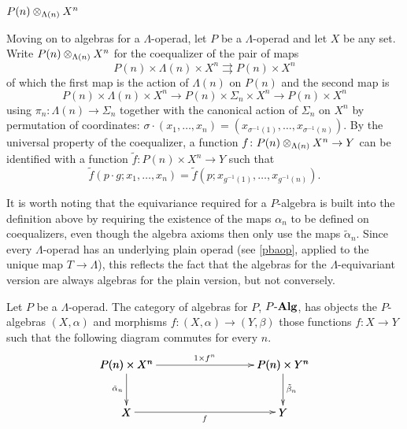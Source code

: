 $P(n) \otimes_{\Lambda(n)} X^{n}$

Moving on to algebras for a $\Lambda$-operad, let $P$ be a $\Lambda$-operad and let $X$ be any set. Write $P(n) \otimes_{\Lambda(n)} X^{n}$ for the coequalizer of the pair of maps
  \[
    P(n) \times \Lambda(n) \times X^{n} \rightrightarrows P(n) \times X^{n}
  \]
of which the first map is the action of $\Lambda(n)$ on $P(n)$ and the second map is
  \[
    P(n) \times \Lambda(n) \times X^{n} \rightarrow P(n) \times \Sigma_{n} \times X^{n} \rightarrow P(n) \times X^{n}
  \]
using $\pi_{n} \colon \Lambda(n) \rightarrow \Sigma_{n}$ together with the canonical action of $\Sigma_{n}$ on $X^{n}$ by permutation of coordinates: $\sigma \cdot (x_{1}, \ldots, x_{n}) = (x_{\sigma^{-1}(1)}, \ldots, x_{\sigma^{-1}(n)})$. By the universal property of the coequalizer, a function $f \colon P(n) \otimes_{\Lambda(n)} X^{n} \rightarrow Y$ can be identified with a function $\tilde{f} \colon P(n) \times X^{n} \rightarrow Y$ such that
  \[
    \tilde{f}(p\cdot g; x_{1}, \ldots, x_{n}) = \tilde{f}\left(p; x_{g^{-1}(1)}, \ldots, x_{g^{-1}(n)}\right).
  \]

\begin{rem}
It is worth noting that the equivariance required for a $P$-algebra is built into the definition above by requiring the existence of the maps $\alpha_{n}$ to be defined on coequalizers, even though the algebra axioms then only use the maps $\tilde{\alpha}_{n}$. Since every $\Lambda$-operad has an underlying plain operad (see \cref{pbaop}, applied to the unique map $T \rightarrow \Lambda$), this reflects the fact that the algebras for the $\Lambda$-equivariant version are always algebras for the plain version, but not conversely.
\end{rem}

\begin{Defi}
Let $P$ be a $\Lambda$-operad. The category of algebras for $P$, $P\mbox{-}\mathbf{Alg}$, has objects the $P$-algebras $(X, \alpha)$ and morphisms $f \colon  (X, \alpha) \rightarrow (Y, \beta)$ those functions $f \colon X \rightarrow Y$ such that the following diagram commutes for every $n$.
  \[
    \xy
      {\ar^{1 \times f^{n}} (0,0)*+{P(n) \times X^{n}}; (50,0)*+{P(n) \times Y^{n}} };
      {\ar^{\tilde{\beta}_{n}} (50,0)*+{P(n) \times Y^{n}}; (50,-15)*+{Y} };
      {\ar_{\tilde{\alpha}_{n}} (0,0)*+{P(n) \times X^{n}}; (0,-15)*+{X} };
      {\ar_{f} (0,-15)*+{X}; (50,-15)*+{Y} };
    \endxy
  \]

\end{Defi}

